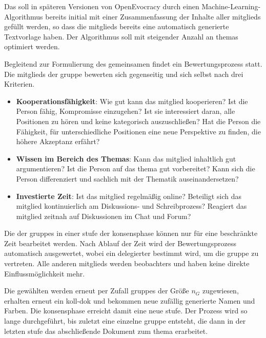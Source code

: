 \documentclass[10pt]{article}
\begin{document}
Das  soll in späteren Versionen von OpenEvocracy durch einen Machine-Learning-Algorithmus bereits initial mit einer Zusammenfassung der Inhalte aller \glspl{mitglied} gefüllt werden, so dass die \glspl{mitglied} bereits eine automatisch generierte Textvorlage haben. Der Algorithmus soll mit steigender Anzahl an \glspl{thema} optimiert werden.

Begleitend zur Formulierung des gemeinsamen  findet ein Bewertungsprozess statt. Die \glspl{mitglied} der \gls{gruppe} bewerten sich gegenseitig und sich selbst nach drei Kriterien.

\begin{itemize}
    \item \textbf{Kooperationsfähigkeit}: Wie gut kann das \gls{mitglied} kooperieren? Ist die Person fähig, Kompromisse einzugehen? Ist sie interessiert daran, alle Positionen zu hören und keine kategorisch auszuschließen? Hat die Person die Fähigkeit, für unterschiedliche Positionen eine neue Perspektive zu finden, die höhere Akzeptanz erfährt?
    \item \textbf{Wissen im Bereich des Themas}: Kann das \gls{mitglied} inhaltlich gut argumentieren? Ist die Person auf das \gls{thema} gut vorbereitet? Kann sich die Person differenziert und sachlich mit der Thematik auseinandersetzen?
    \item \textbf{Investierte Zeit}: Ist das \gls{mitglied} regelmäßig online? Beteiligt sich das \gls{mitglied} kontinuierlich am Diskussions- und Schreibprozess? Reagiert das \gls{mitglied} zeitnah auf Diskussionen im Chat und Forum?
\end{itemize}

Die  der \glspl{gruppe} in einer \gls{stufe} der \gls{konsensphase} können nur für eine beschränkte Zeit bearbeitet werden. Nach Ablauf der Zeit wird der Bewertungsprozess automatisch ausgewertet, wobei ein \gls{delegierter} bestimmt wird, um die \gls{gruppe} zu vertreten. Alle anderen \glspl{mitglied} werden \glspl{beobachter} und haben keine direkte Einflussmöglichkeit mehr.

Die gewählten  werden erneut per Zufall \glspl{gruppe} der Größe $n_G$ zugewiesen, erhalten erneut ein \gls{koll-dok} und bekommen neue zufällig generierte Namen und Farben. Die \gls{konsensphase} erreicht damit eine neue \gls{stufe}. Der Prozess wird so lange durchgeführt, bis zuletzt eine einzelne \gls{gruppe} entsteht, die dann in der letzten \gls{stufe} das abschließende Dokument zum \gls{thema} erarbeitet.
\end{document}
